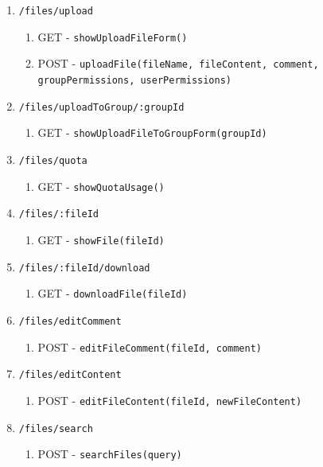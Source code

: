 \documentclass[12pt,DIV14,BCOR10mm,a4paper,parskip=half-,headsepline,headinclude,english,ngerman,bibliography=totocnumbered]{scrreprt}
\begin{document}
\begin{enumerate}
\begin{enumerate}
\begin{enumerate}
      \item \texttt{/files/upload}
      \begin{enumerate}
        \item GET - \texttt{showUploadFileForm()}
        \item POST - \texttt{uploadFile(fileName, fileContent, comment, groupPermissions, userPermissions)}
      \end{enumerate}

      \item \texttt{/files/uploadToGroup/:groupId}
      \begin{enumerate}
        \item GET - \texttt{showUploadFileToGroupForm(groupId)}
      \end{enumerate}
      \item \texttt{/files/quota}
      \begin{enumerate}
        \item GET - \texttt{showQuotaUsage()}
      \end{enumerate}
      \item \texttt{/files/:fileId}
      \begin{enumerate}
        \item GET - \texttt{showFile(fileId)}
      \end{enumerate}
      \item \texttt{/files/:fileId/download}
      \begin{enumerate}
        \item GET - \texttt{downloadFile(fileId)}
      \end{enumerate}
      \item \texttt{/files/editComment}
      \begin{enumerate}
        \item POST - \texttt{editFileComment(fileId, comment)}
      \end{enumerate}
      \item \texttt{/files/editContent}
      \begin{enumerate}
        \item POST - \texttt{editFileContent(fileId, newFileContent)}
      \end{enumerate}
      \item \texttt{/files/search}
      \begin{enumerate}
        \item POST - \texttt{searchFiles(query)}
      \end{enumerate}
    \end{enumerate}


\end{enumerate}
\end{enumerate}
\end{document}
